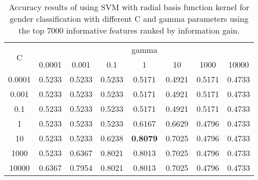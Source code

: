 \documentclass[a4paper]{llncs}
\begin{document}
\begin{table}[!htbp]
\centering
\begin{tabular}{|c|c|c|c|c|c|c|c|}
\hline
\multirow{2}{*}{C} & \multicolumn{7}{c|}{gamma}                                            \\ \cline{2-8} 
                   & 0.0001 & 0.001  & 0.1    & 1               & 10     & 1000   & 10000  \\ \hline
0.0001             & 0.5233 & 0.5233 & 0.5233 & 0.5171          & 0.4921 & 0.5171 & 0.4733 \\ \hline
0.001              & 0.5233 & 0.5233 & 0.5233 & 0.5171          & 0.4921 & 0.5171 & 0.4733 \\ \hline
0.1                & 0.5233 & 0.5233 & 0.5233 & 0.5171          & 0.4921 & 0.5171 & 0.4733 \\ \hline
1                  & 0.5233 & 0.5233 & 0.5233 & 0.6167          & 0.6629 & 0.4796 & 0.4733 \\ \hline
10                 & 0.5233 & 0.5233 & 0.6238 & \textbf{0.8079} & 0.7025 & 0.4796 & 0.4733 \\ \hline
1000               & 0.5233 & 0.6367 & 0.8021 & 0.8013          & 0.7025 & 0.4796 & 0.4733 \\ \hline
10000              & 0.6367 & 0.7954 & 0.8021 & 0.8013          & 0.7025 & 0.4796 & 0.4733 \\ \hline
\end{tabular}
\caption{Accuracy results of using SVM with radial basis function kernel for gender classification with different C and gamma parameters using the top 7000 informative features ranked by information gain.}
\label{table:SVMRBFGender}
\end{table}
\end{document}
